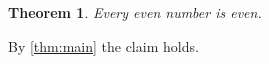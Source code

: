 \documentclass{article}
\newtheorem{theorem}{Theorem}
\begin{document}
\begin{theorem}\label{thm:main}
Every even number is even.
\end{theorem}
By \autoref{thm:main} the claim holds.
\end{document}
